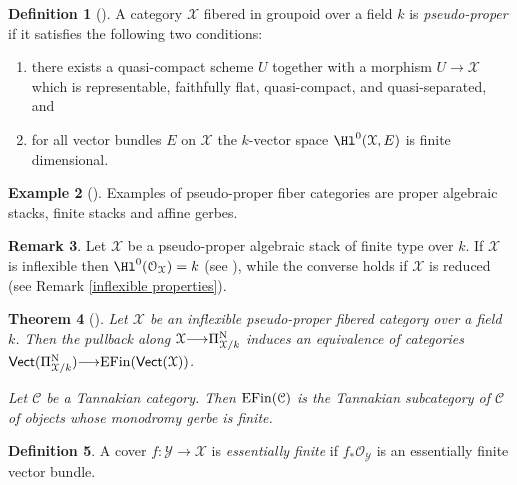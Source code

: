 \documentclass[12pt,reqno]{amsart}
\theoremstyle{plain}
\newtheorem{thm}{Theorem}[section]
\theoremstyle{definition}
\newtheorem{defn}[thm]{Definition}
\newtheorem{ex}[thm]{Example}
\newtheorem{rmk}[thm]{Remark}
\numberwithin{thm}{section}
\newcounter{x}\setcounter{x}{1}
\theoremstyle{plain}
\begin{document}
\begin{defn}[{\cite[p.~20, Definition 7.1]{BV}}] \label{pseudo-proper}
A category ${{\mathcal X}}$ fibered in groupoid over a field $k$ is \textit{pseudo-proper} if it satisfies the following two conditions:
\begin{enumerate}
\item there exists a quasi-compact scheme $U$ together with a morphism $U{\longrightarrow} {\mathcal{X}}$ which is
representable, faithfully flat, quasi-compact, and quasi-separated, and
\item for all vector bundles $E$ on ${\mathcal{X}}$ the $k$-vector space $\Hl^0({{\mathcal X}},E)$ is finite dimensional.
\end{enumerate}
\end{defn}

\begin{ex}[{\cite[p.~20, Example 7.2]{BV}}] 
Examples of pseudo-proper fiber categories are proper algebraic stacks, finite stacks and affine gerbes.
\end{ex}

\begin{rmk}\label{infl then HO=k}
 Let ${\mathcal{X}}$ be a pseudo-proper algebraic stack of finite type over $k$. If ${\mathcal{X}}$ is
inflexible then $\Hl^0({\mathcal{O}_{\mathcal{X}}})=k$ (see \cite[Lemma 7.4]{BV}), while the converse
holds if ${\mathcal{X}}$ is reduced (see Remark \ref{inflexible properties}).
\end{rmk}

\begin{thm}[{\cite[p.~22, Theorem 7.9, Corollary 7.10]{BV}}]\label{monodromy essentially finite}
Let ${{\mathcal X}}$ be an inflexible pseudo-proper fibered category over a field $k$. Then the
pullback along ${\mathcal{X}}{\longrightarrow}\Pi^{\textup{N}}_{{\mathcal{X}}/k}$ induces an equivalence
of categories ${\text{\sf Vect}}(\Pi_{{{\mathcal X}}/k}^{\textup{N}}){\longrightarrow} {{\rm EFin}}({\text{\sf Vect}}({{\mathcal X}}))$.

Let ${{\mathcal C}}$ be a Tannakian category. Then ${{\rm EFin}}({{\mathcal C}})$ is the Tannakian subcategory of ${\mathcal{C}}$ of objects whose monodromy gerbe is finite.
\end{thm}

\begin{defn}\label{essentially finite cover} A cover $f \colon {\mathcal{Y}} {\longrightarrow} {\mathcal{X}}$ is {\it essentially
finite} if $f_* {\mathcal{O}_{\mathcal{Y}}}$ is an essentially finite vector bundle.
\end{defn}
\end{document}
